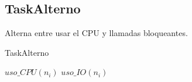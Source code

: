\subsection{TaskAlterno}

Alterna entre usar el CPU y llamadas bloqueantes.

\begin{algorithm}
 \caption{TaskAlterno}
 \begin{algorithmic}[1]
		 
			\State $uso\_CPU(n_{i})$
		\Else 
			\State$uso\_IO(n_{i})$ 
		\EndIf
	\EndFor
 \EndProcedure
 \end{algorithmic}
\end{algorithm}